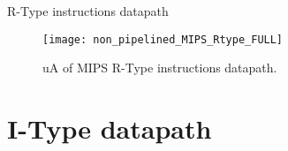 % 
\begin{frame}{R-Type instructions datapath}
\vspace{-6.22pt}
  \begin{figure}
  \centering
  \texttt{[image: non\_pipelined\_MIPS\_Rtype\_FULL]}
  \vspace{-3pt}
  \caption{\ac{uA} of \ac{MIPS} R-Type instructions datapath.}
  \label{Figure:non_pipelined_MIPS_Rtype_FULL}
  \end{figure}
\end{frame}

\section{I-Type datapath}
% 
